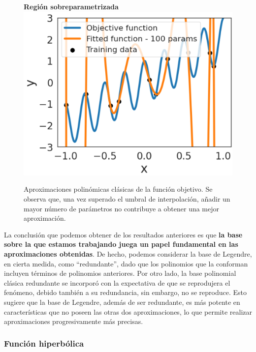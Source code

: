 \begin{figure}[h]
    \begin{minipage}{0.32\textwidth}
        \centering
        \textbf{Región sobreparametrizada} \\[0.5ex] 
        \includegraphics[width=\linewidth]{img/experiments/OLS1.3.png}
    \end{minipage}
    \caption[Aproximaciones polinómicas clásicas de la función objetivo.]{Aproximaciones polinómicas clásicas de la función objetivo. Se observa que, una vez superado el umbral de interpolación, añadir un mayor número de parámetros no contribuye a obtener una mejor aproximación.}\label{fig:polynomial1DD}
\end{figure}

La conclusión que podemos obtener de los resultados anteriores es que \textbf{la base sobre la que estamos trabajando juega un papel fundamental en las aproximaciones obtenidas}. De hecho, podemos considerar la base de Legendre, en cierta medida, como ``redundante'', dado que los polinomios que la conforman incluyen términos de polinomios anteriores. Por otro lado, la base polinomial clásica redundante se incorporó con la expectativa de que se reprodujera el fenómeno, debido también a su redundancia, sin embargo, no se reproduce. Esto sugiere que la base de Legendre, además de ser redundante, es más potente en características que no poseen las otras dos aproximaciones, lo que permite realizar aproximaciones progresivamente más precisas.

\subsubsection{Función hiperbólica}\label{subsubsec:funcion-hiperbolica}

